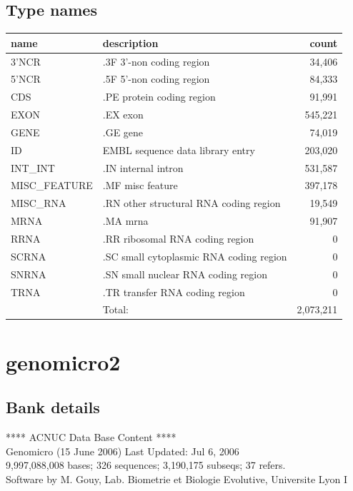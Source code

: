 \documentclass{article}
\begin{document}
\begin{Schunk}
\subsection{Type names}
\noindent\begin{tabular}{llr}
\hline \hline
name & description & count \\
\hline
3'NCR  &  .3F  3'-non coding region  &  34,406 \\
5'NCR  &  .5F  5'-non coding region  &  84,333 \\
CDS  &  .PE protein coding region  &  91,991 \\
EXON  &  .EX exon  &  545,221 \\
GENE  &  .GE gene  &  74,019 \\
ID  &  EMBL sequence data library entry  &  203,020 \\
INT\_INT  &  .IN  internal intron  &  531,587 \\
MISC\_FEATURE  &  .MF misc feature  &  397,178 \\
MISC\_RNA  &  .RN other structural RNA coding region  &  19,549 \\
MRNA  &  .MA mrna  &  91,907 \\
RRNA  &  .RR ribosomal RNA coding region  &  0 \\
SCRNA  &  .SC small cytoplasmic RNA coding region  &  0 \\
SNRNA  &  .SN small nuclear RNA coding region  &  0 \\
TRNA  &  .TR transfer RNA coding region  &  0 \\
\hline
 & Total: & 2,073,211 \\
\hline \hline
\end{tabular}

\section{ genomicro2 }
\subsection{Bank details}
             ****     ACNUC Data Base Content      ****                         \\
              Genomicro (15 June 2006) Last Updated: Jul  6, 2006\\
9,997,088,008 bases; 326 sequences; 3,190,175 subseqs; 37 refers.\\
Software by M. Gouy, Lab. Biometrie et Biologie Evolutive, Universite Lyon I 


\end{Schunk}
\end{document}
